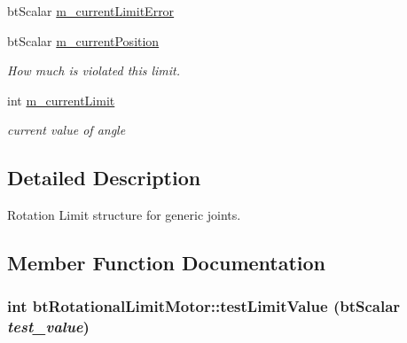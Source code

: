 \begin{Indent}{\bf }\par
\begin{CompactItemize}
\item 
btScalar \hyperlink{classbt_rotational_limit_motor_7128feccb391176842f287b584e375d3}{m\_\-currentLimitError}
\item 
\hypertarget{classbt_rotational_limit_motor_1f334e324d5e337257c2b338e8e948de}{
btScalar \hyperlink{classbt_rotational_limit_motor_1f334e324d5e337257c2b338e8e948de}{m\_\-currentPosition}}
\label{classbt_rotational_limit_motor_1f334e324d5e337257c2b338e8e948de}

\begin{CompactList}\small\item\em How much is violated this limit. \item\end{CompactList}\item 
int \hyperlink{classbt_rotational_limit_motor_d1e4fa6cb3ea2e4b78c96feab97448e8}{m\_\-currentLimit}
\begin{CompactList}\small\item\em current value of angle \item\end{CompactList}\end{CompactItemize}
\end{Indent}


\subsection{Detailed Description}
Rotation Limit structure for generic joints. 

\subsection{Member Function Documentation}
\hypertarget{classbt_rotational_limit_motor_c0651bd36beda2dbb23c45a90dc1cccd}{
\subsubsection[testLimitValue]{\setlength{\rightskip}{0pt plus 5cm}int btRotationalLimitMotor::testLimitValue (btScalar {\em test\_\-value})}}
\label{classbt_rotational_limit_motor_c0651bd36beda2dbb23c45a90dc1cccd}


